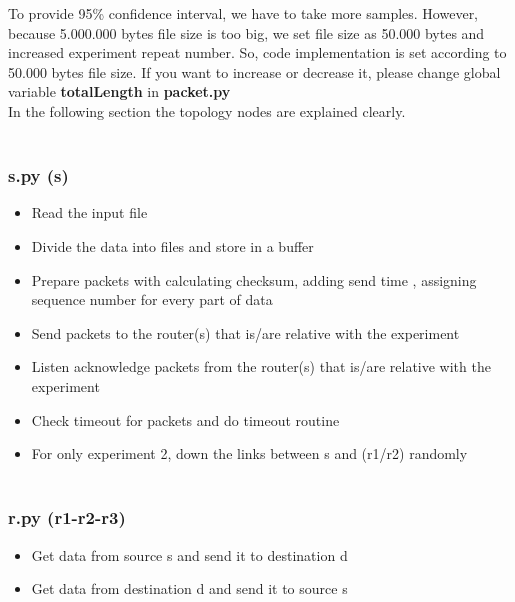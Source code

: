 \documentclass[conference]{IEEEtran}
\begin{document}
To provide 95\% confidence interval, we have to take more samples. However, because 5.000.000 bytes file size is too big, we set file size as 50.000 bytes and increased experiment repeat number. So, code implementation is set according to 50.000 bytes file size. If you want to increase or decrease it, please change global variable \textbf{totalLength} in \textbf{packet.py} \\


In the following section the topology nodes are explained clearly.\\ \\

\subsubsection{\textbf{s.py (s)}} 
\begin{itemize} 
    \item Read the input file \\
    
    \item Divide the data into files and store in a buffer \\
    
    \item Prepare packets with calculating checksum, adding send time , assigning sequence number for every part of data \\
    
    \item Send packets to the router(s) that is/are relative with the experiment \\
    
    \item Listen acknowledge packets from the router(s) that is/are relative with the experiment \\
    
    \item Check timeout for packets and do timeout routine \\
    
    \item For only experiment 2, down the links between s and (r1/r2) randomly\\ \\
\end{itemize}

\subsubsection{\textbf{r.py (r1-r2-r3)}}
\begin{itemize}
    \item Get data from source s and send it to destination d \\
    
    \item Get data from destination d and send it to source s\\ \\
\end{itemize}
\end{document}
